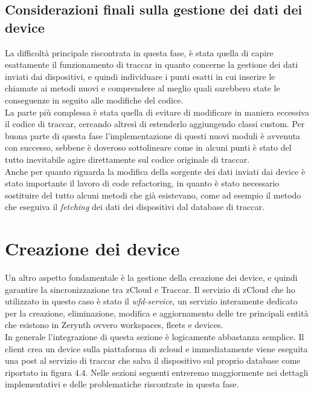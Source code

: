 \documentclass[a4paper,titlepage,12pt]{book}
\begin{document}
\subsection{\sffamily
Considerazioni finali sulla gestione dei dati dei device}
La difficoltà principale riscontrata in questa fase, è stata quella di capire esattamente il funzionamento di traccar in quanto concerne la gestione dei dati inviati dai dispositivi, e quindi individuare i punti esatti in cui inserire le chiamate ai metodi nuovi e comprendere al meglio quali sarebbero state le conseguenze in seguito alle modifiche del codice.\\
 La parte più complessa è stata quella di evitare di modificare in maniera eccessiva il codice di traccar, cercando altresì di estenderlo aggiungendo classi custom. Per buona parte di questa fase l'implementazione di questi nuovi moduli è avvenuta con successo, sebbene è doveroso sottolineare come in alcuni punti è stato del tutto inevitabile agire direttamente sul codice originale di traccar.\\
Anche per quanto riguarda la modifica della sorgente dei dati inviati dai device è stato importante il lavoro di code refactoring, in quanto è stato necessario sostituire del tutto alcuni metodi che già esistevano, come ad esempio il metodo che eseguiva il \textit{fetching} dei dati dei dispositivi dal database di traccar.

\section{\sffamily
Creazione dei device}
Un altro aspetto fondamentale è la gestione della creazione dei device, e quindi garantire la sincronizzazione tra zCloud e Traccar. Il servizio di zCloud che ho utilizzato in questo caso è stato il \textit{wfd-service}, un servizio interamente dedicato per la creazione, eliminazione, modifica e aggiornamento delle tre principali entità che esistono in Zerynth ovvero workspaces, fleets e devices. \\
In generale l'integrazione di questa sezione è logicamente abbastanza semplice. Il client crea un device sulla piattaforma di zcloud e immediatamente viene eseguita una post al servizio di traccar che salva il dispositivo sul proprio database come riportato in figura 4.4. Nelle sezioni seguenti entreremo maggiormente nei dettagli implementativi e delle problematiche riscontrate in questa fase.
\end{document}
